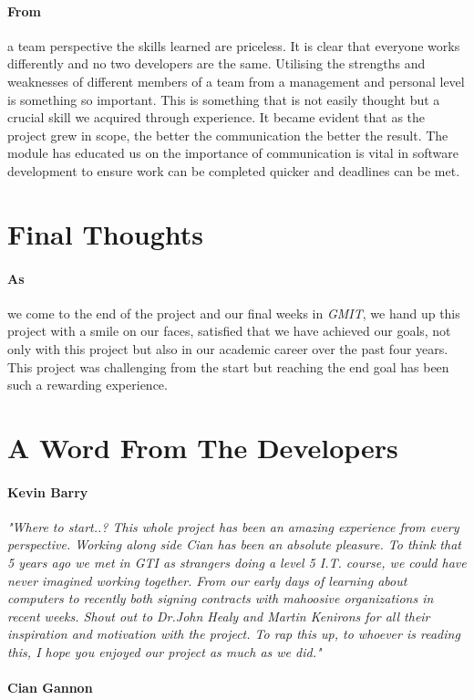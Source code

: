 \paragraph{From} a team perspective the skills learned are priceless. It is clear that everyone works differently and no two developers are the same. Utilising the strengths and weaknesses of different members of a team from a management and personal level is something so important. This is something that is not easily thought but a crucial skill we acquired through experience. It became evident that as the project grew in scope, the better the communication the better the result. The module has educated us on the importance of communication is vital in software development to ensure work can be completed quicker and deadlines can be met.

\section{Final Thoughts} 
\paragraph{As} we come to the end of the project and our final weeks in \textit{GMIT}, we hand up this project with a smile on our faces, satisfied that we have achieved our goals, not only with this project but also in our academic career over the past four years. This project was challenging from the start but reaching the end goal has been such a rewarding experience.

\section{A Word From The Developers}

\paragraph{Kevin Barry}\textit{"Where to start..? This whole project has been an amazing experience from every perspective. Working along side Cian has been an absolute pleasure. To think that 5 years ago we met in GTI as strangers doing a level 5 I.T. course, we could have never imagined working together. From our early days of learning about computers to recently both signing contracts with mahoosive organizations in recent weeks. Shout out to Dr.John Healy and Martin Kenirons for all their inspiration and motivation with the project. To rap this up, to whoever is reading this, I hope you enjoyed our project as much as we did."}

\paragraph{Cian Gannon}